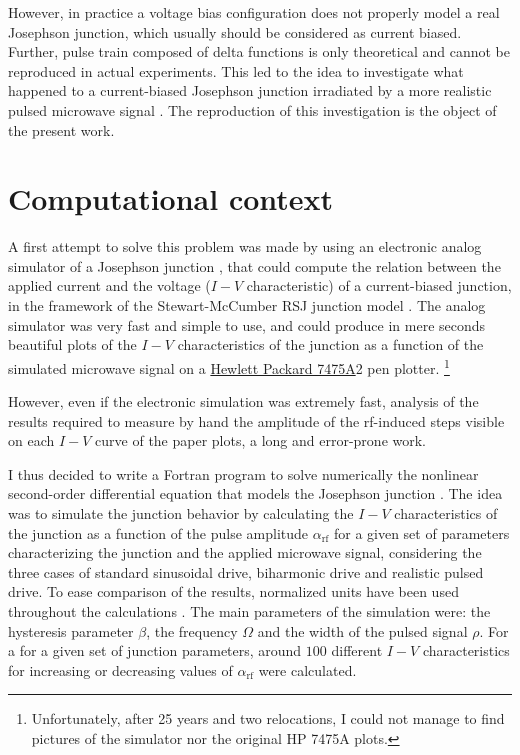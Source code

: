 However, in practice a voltage bias configuration does not properly model a real Josephson junction, which usually should be considered as current biased.
Further, pulse train composed of delta functions is only theoretical and cannot be reproduced in actual experiments. 
This led to the idea to investigate what happened to a current-biased Josephson junction irradiated by a more realistic pulsed microwave signal \cite{Maggi:1996, Maggi:1997}. 
The reproduction of this investigation is the object of the present work.



\section{Computational context}
\label{computational-context}

A first attempt to solve this problem was made by using an electronic analog simulator of a Josephson junction \cite {Henry:1981}, that could compute the relation between the applied current and the voltage ($I-V$ characteristic) of a current-biased junction, in the framework of the Stewart-McCumber RSJ junction model \cite{McCumber:1968, Stewart:1974}.
The analog simulator was very fast and simple to use, and could produce in mere seconds beautiful plots of the $I-V$ characteristics of the junction as a function of the simulated microwave signal on a \href{http://www.hpmuseum.net/display_item.php?hw=74}{Hewlett Packard 7475A}2 pen plotter.
\footnote{Unfortunately, after 25 years and two relocations, I could not manage to find pictures of the simulator nor the original HP 7475A plots.} 

However, even if the electronic simulation was extremely fast, analysis of the results required to measure by hand the amplitude of the rf-induced steps visible on each $I-V$ curve of the paper plots, a long and error-prone work.

I thus decided to write a Fortran program to solve numerically the nonlinear second-order differential equation that models the Josephson junction \cite{McCumber:1968, Stewart:1974}. 
The idea was to simulate the junction behavior by calculating the $I-V$ characteristics of the junction as a function of the pulse amplitude $\alpha_\mathrm{rf}$ for a given set of parameters characterizing the junction and the applied microwave signal, considering the three cases of standard sinusoidal drive, biharmonic drive and realistic pulsed drive. 
To ease comparison of the results, normalized units have been used throughout the calculations \cite{McCumber:1968, Stewart:1974}.
The main parameters of the simulation were: the hysteresis parameter $\beta$, the frequency $\Omega$ and the width of the pulsed signal $\rho$. 
For a for a given set of junction parameters, around $100$ different $I-V$ characteristics for increasing or decreasing values of $\alpha_\mathrm{rf}$ were calculated.

